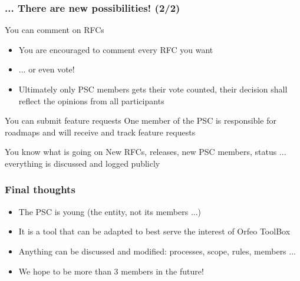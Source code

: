 \documentclass[8pt]{beamer}
\begin{document}
\begin{frame}
\frametitle{... There are new possibilities! (2/2)}

\begin{block}{You can comment on RFCs}
\begin{itemize}
\item You are encouraged to comment every RFC you want
\item ... or even vote!
\item Ultimately only PSC members gets their vote counted, their
  decision shall reflect the opinions from all participants
\end{itemize}
\end{block}

\begin{block}{You can submit feature requests}
One member of the PSC is responsible for roadmaps and will receive and track feature requests
\end{block}

\begin{block}{You know what is going on}
New RFCs, releases, new PSC members, status ... everything is discussed and logged publicly
\end{block}
\end{frame}

\begin{frame}
\frametitle{Final thoughts}

\begin{itemize}
\item The PSC is young (the entity, not its members ...)
\item It is a tool that can be adapted to best serve the interest of Orfeo ToolBox
\item Anything can be discussed and modified: processes, scope, rules, members ...
\item We hope to be more than 3 members in the future!
\end{itemize}

\end{frame}
\end{document}

